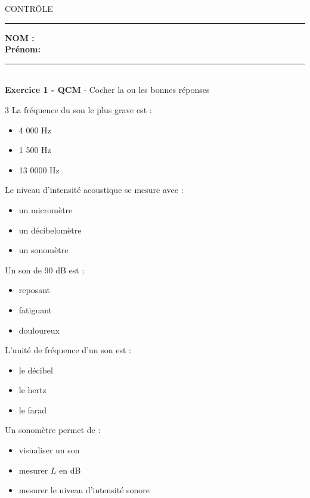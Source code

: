 \documentclass[11pt,a4paper]{article}
\begin{document}
\begin{center}
\LARGE{CONTRÔLE}
\end{center}




\hrule

\flushleft \textbf{NOM : \\[2mm]
Prénom: \\[0,3cm]
}
\hrule\
\\[0,2cm]



\textbf{Exercice 1 - QCM} -
Cocher la ou les bonnes réponses\\
\begin{multicols}{3}
 La fréquence du son le plus grave est  : 
\begin{itemize}[label=$\square$]
	\item 4 000 Hz
	\item 1 500 Hz
	\item 13 0000 Hz
\end{itemize}

\vspace{2mm}

 Le niveau d'intensité acoustique se mesure avec  : 
\begin{itemize}[label=$\square$]
	\item un micromètre
	\item un décibelomètre
	\item un sonomètre
\end{itemize}

\vspace{2mm}

 Un son de 90 dB est : 
\begin{itemize}[label=$\square$]
	\item reposant
	\item fatiguant
	\item douloureux
\end{itemize}

\vspace{5mm}


 L'unité de fréquence d'un son est  : 
\begin{itemize}[label=$\square$]
	\item le décibel
	\item le hertz
	\item le farad 
\end{itemize}


 Un sonomètre permet de  : 
\begin{itemize}[label=$\square$]
	\item visualiser un son
	\item mesurer $L$ en dB
	\item mesurer le niveau d'intensité sonore
\end{itemize}


\end{multicols}
\end{document}
